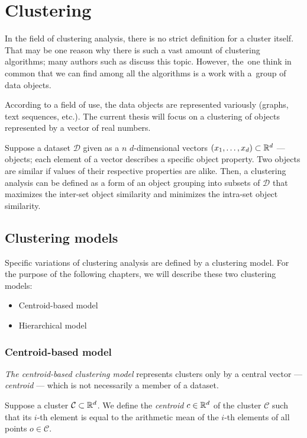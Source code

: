 \chapter{Clustering}

In the field of clustering analysis, there is no strict definition for a cluster itself. That may be one reason why there is such a vast amount of clustering algorithms; many authors such as \citet{estivill2002so} discuss this topic.  However, the~one think in common that we can find among all the algorithms is a work with a~group of data objects.


According to a field of use, the data objects are represented variously (graphs, text sequences, etc.). The current thesis will focus on a clustering of objects represented by a vector of real numbers.

Suppose a dataset $\mathcal{D}$ given as a $n$ $d$-dimensional vectors $(x_1,\dots,x_d) \subset \mathbb{R}^d$  --- objects; each element of a vector describes a specific object property. Two objects are similar if values of their respective properties are alike. Then, a clustering analysis can be defined as a form of an object grouping into subsets of $\mathcal{D}$ that maximizes the inter-set object similarity and minimizes the intra-set object similarity.

\section{Clustering models}

Specific variations of clustering analysis are defined by a clustering model. For the purpose of the following chapters, we will describe these two clustering models:
\begin{itemize}
	\item Centroid-based model
	\item Hierarchical model
\end{itemize}


\subsection{Centroid-based model}

\emph{The centroid-based clustering model} represents clusters only by a central vector --- \emph{centroid} --- which is not necessarily a member of a dataset.

\begin{defn}[Centroid]
	Suppose a cluster $\mathcal{C} \subset \mathbb{R}^d$. We define the \emph{centroid} $c \in \mathbb{R}^d$ of the cluster $\mathcal{C}$ such that its $i$-th element is equal to the arithmetic mean of the $i$-th elements of all points $o \in \mathcal{C}$. 
	\label{def01:centr}
\end{defn}

